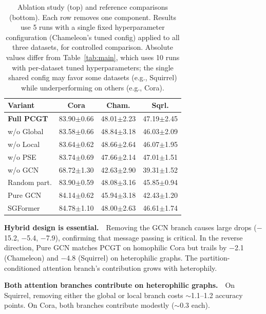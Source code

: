 \documentclass[manuscript, screen, review, anonymous]{acmart}
\begin{document}
\begin{table}[t]
\caption{Ablation study (top) and reference comparisons (bottom). Each row removes one component. Results use 5 runs with a single fixed hyperparameter configuration (Chameleon's tuned config) applied to all three datasets, for controlled comparison. Absolute values differ from Table~\ref{tab:main}, which uses 10 runs with per-dataset tuned hyperparameters; the single shared config may favor some datasets (e.g., Squirrel) while underperforming on others (e.g., Cora).}
\label{tab:ablation}
\centering
\small
\begin{tabular}{l|ccc}
\toprule
\textbf{Variant} & \textbf{Cora} & \textbf{Cham.} & \textbf{Sqrl.} \\
\midrule
\textbf{Full PCGT} & 83.90{\scriptsize$\pm$0.66} & 48.01{\scriptsize$\pm$2.23} & 47.19{\scriptsize$\pm$2.45} \\
\midrule
w/o Global & 83.58{\scriptsize$\pm$0.66} & 48.84{\scriptsize$\pm$3.18} & 46.03{\scriptsize$\pm$2.09} \\
w/o Local & 83.64{\scriptsize$\pm$0.62} & 48.66{\scriptsize$\pm$2.64} & 46.07{\scriptsize$\pm$1.95} \\
w/o PSE & 83.74{\scriptsize$\pm$0.69} & 47.66{\scriptsize$\pm$2.14} & 47.01{\scriptsize$\pm$1.51} \\
w/o GCN & 68.72{\scriptsize$\pm$1.30} & 42.63{\scriptsize$\pm$2.90} & 39.31{\scriptsize$\pm$1.52} \\
Random part. & 83.90{\scriptsize$\pm$0.59} & 48.08{\scriptsize$\pm$3.16} & 45.85{\scriptsize$\pm$0.94} \\
\midrule
Pure GCN & 84.14{\scriptsize$\pm$0.62} & 45.94{\scriptsize$\pm$3.18} & 42.43{\scriptsize$\pm$1.20} \\
SGFormer & 84.78{\scriptsize$\pm$1.10} & 48.00{\scriptsize$\pm$2.63} & 46.61{\scriptsize$\pm$1.74} \\
\bottomrule
\end{tabular}
\end{table}

\textbf{Hybrid design is essential.}~~Removing the GCN branch causes large drops ($-$15.2, $-$5.4, $-$7.9), confirming that message passing is critical. In the reverse direction, Pure GCN matches PCGT on homophilic Cora but trails by $-$2.1 (Chameleon) and $-$4.8 (Squirrel) on heterophilic graphs. The partition-conditioned attention branch's contribution grows with heterophily.

\textbf{Both attention branches contribute on heterophilic graphs.}~~On Squirrel, removing either the global or local branch costs ${\sim}$1.1--1.2 accuracy points. On Cora, both branches contribute modestly (${\sim}$0.3 each).
\end{document}
